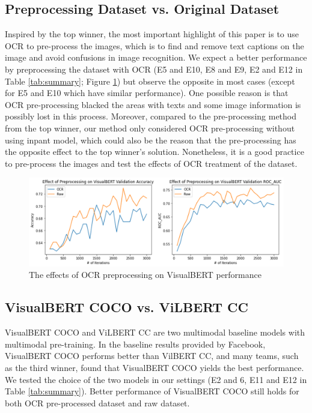 \documentclass[10pt,twocolumn,letterpaper]{article}
\begin{document}
\subsection{Preprocessing Dataset vs. Original Dataset}
Inspired by the top winner, the most important highlight of this paper is to use OCR to pre-process the images, which is to find and remove text captions on the image and avoid confusions in image recognition. We expect a better performance by preprocessing the dataset with OCR (E5 and E10, E8 and E9, E2 and E12 in Table \ref{tab:summary}; Figure \ref{fig:ocr}) but observe the opposite in most cases (except for E5 and E10 which have similar performance). One possible reason is that OCR pre-processing blacked the areas with texts and some image information is possibly lost in this process. Moreover, compared to the pre-processing method from the top winner, our method only considered OCR pre-processing without using inpant model, which could also be the reason that the pre-processing has the opposite effect to the top winner's solution. Nonetheless, it is a good practice to pre-process the images and test the effects of OCR treatment of the dataset.

\begin{figure}[t]
\begin{center}
   \includegraphics[width=1 \linewidth]{Figure7.png}
\end{center}
   \caption{The effects of OCR preprocessing on VisualBERT performance}
\label{fig:ocr}
\end{figure}


\subsection{VisualBERT COCO vs. ViLBERT CC}
VisualBERT COCO and ViLBERT CC are two multimodal baseline models with multimodal pre-training. In the baseline results provided by Facebook, VisualBERT COCO performs better than VilBERT CC, and many teams, such as the third winner, found that VisualBERT COCO yields the best performance. We tested the choice of the two models in our settings (E2 and 6, E11 and E12 in Table \ref{tab:summary}). Better performance of VisualBERT COCO still holds for both OCR pre-processed dataset and raw dataset. 
\end{document}
